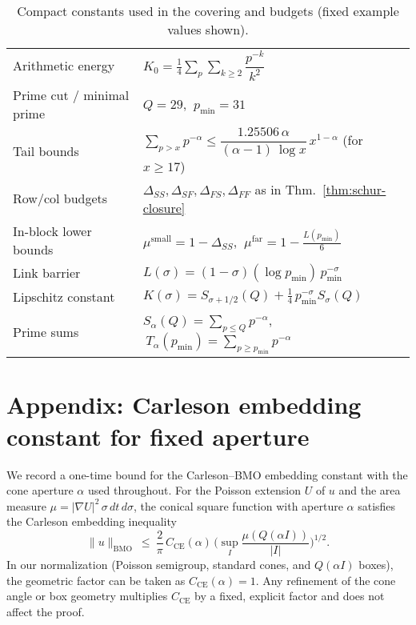 \documentclass[11pt]{article}
\theoremstyle{definition}
\theoremstyle{remark}
\begin{document}
\begin{table}[H]
\centering
\caption{Compact constants used in the covering and budgets (fixed example values shown).}
\begin{tabular}{l l}
\toprule
Arithmetic energy & $K_0=\tfrac14\sum_{p}\sum_{k\ge2} \dfrac{p^{-k}}{k^2}$ \\ 
Prime cut / minimal prime & $Q=29$, $\ p_{\min}=31$ \\ 
Tail bounds & $\sum_{p>x}p^{-\alpha} \le \dfrac{1.25506\,\alpha}{(\alpha-1)\,\log x}\,x^{1-\alpha}$ (for $x\ge 17$) \\ 
Row/col budgets & $\Delta_{SS},\Delta_{SF},\Delta_{FS},\Delta_{FF}$ as in Thm.~\ref{thm:schur-closure} \\ 
In-block lower bounds & $\mu^{\mathrm{small}}=1-\Delta_{SS}$, $\ \mu^{\mathrm{far}}=1-\tfrac{L(p_{\min})}{6}$ \\ 
Link barrier & $L(\sigma)=(1-\sigma)(\log p_{\min})\,p_{\min}^{-\sigma}$ \\ 
Lipschitz constant & $K(\sigma)=S_{\sigma+1/2}(Q)+\tfrac14\,p_{\min}^{-\sigma}S_{\sigma}(Q)$ \\ 
Prime sums & $S_{\alpha}(Q)=\sum_{p\le Q} p^{-\alpha}$, $\ T_{\alpha}(p_{\min})=\sum_{p\ge p_{\min}} p^{-\alpha}$ \\ 
\bottomrule
\end{tabular}
\end{table}

\section{Appendix: Carleson embedding constant for fixed aperture}\label{app:CE-constant}
We record a one-time bound for the Carleson--BMO embedding constant with the cone aperture $\alpha$ used throughout. For the Poisson extension $U$ of $u$ and the area measure $\mu=|\nabla U|^2\,\sigma\,dt\,d\sigma$, the conical square function with aperture $\alpha$ satisfies the Carleson embedding inequality
\[
  \|u\|_{\mathrm{BMO}}\ \le\ \frac{2}{\pi}\,C_{\mathrm{CE}}(\alpha)\,\Big(\sup_I \frac{\mu(Q(\alpha I))}{|I|}\Big)^{\!1/2}.
\]
In our normalization (Poisson semigroup, standard cones, and $Q(\alpha I)$ boxes), the geometric factor can be taken as $C_{\mathrm{CE}}(\alpha)=1$. Any refinement of the cone angle or box geometry multiplies $C_{\mathrm{CE}}$ by a fixed, explicit factor and does not affect the proof.
\end{document}
